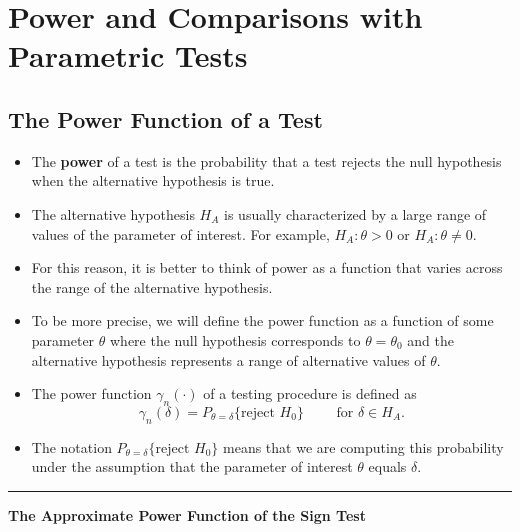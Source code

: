 \documentclass[]{book}
\begin{document}
\hypertarget{power-and-comparisons-with-parametric-tests}{%
\section{Power and Comparisons with Parametric Tests}\label{power-and-comparisons-with-parametric-tests}}

\hypertarget{the-power-function-of-a-test}{%
\subsection{The Power Function of a Test}\label{the-power-function-of-a-test}}

\begin{itemize}
\item
  The \textbf{power} of a test is the probability
  that a test rejects the null hypothesis when the
  alternative hypothesis is true.
\item
  The alternative hypothesis \(H_{A}\) is usually characterized
  by a large range of values of the parameter of interest.
  For example, \(H_{A}: \theta > 0\) or \(H_{A}: \theta \neq 0\).
\item
  For this reason, it is better to think of power
  as a function that varies across the range
  of the alternative hypothesis.
\item
  To be more precise, we will define the power
  function as a function of some parameter \(\theta\)
  where the null hypothesis corresponds to \(\theta = \theta_{0}\)
  and the alternative hypothesis represents a range
  of alternative values of \(\theta\).
\item
  The power function \(\gamma_{n}(\cdot)\) of a testing procedure is defined as
  \begin{equation}
  \gamma_{n}(\delta) = P_{\theta=\delta}\{  \textrm{reject } H_{0} \} \qquad \textrm{ for } \delta \in H_{A}. \nonumber
  \end{equation}
\item
  The notation \(P_{\theta=\delta}\{ \textrm{reject } H_{0} \}\) means that we are computing this
  probability under the assumption that the parameter of interest \(\theta\) equals \(\delta\).
\end{itemize}

\begin{center}\rule{0.5\linewidth}{\linethickness}\end{center}

\textbf{The Approximate Power Function of the Sign Test}
\end{document}
